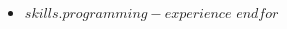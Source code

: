 \documentclass[letterpaper,11pt]{article}
\makeatletter
\newcommand{\ressubheading}[4]{\vspace{-7pt}
\begin{tabular*}{7in}{l@{\extracolsep{\fill}}r}
	\textbf{#1} & #2 \\
	\ifstrempty{#3}{
	}{
		\textit{#3} & #4 \\
	}
\end{tabular*}\vspace{-6pt}}
\makeatother
\begin{document}
\begin{multicols*}{5}
%
	\begin{itemize}
		$for(skills.programming-experience)$
			\item{$skills.programming-experience$}\vspace{-7pt}
		$endfor$
	\end{itemize}

\end{multicols*}
% 
\end{document}
